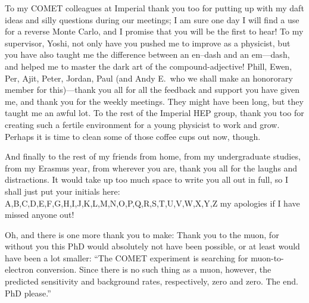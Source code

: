 \begin{acknowledgements}
To my COMET colleagues at Imperial thank you too for putting up with my daft ideas and silly questions during our meetings; I am sure one day I will find a use for a reverse Monte Carlo, and I promise that you will be the first to hear!
To my supervisor, Yoshi, not only have you pushed me to improve as a physicist, but you have also taught me the difference between an en--dash and an em---dash, and helped me to master the dark art of the compound-adjective!
	Phill, Ewen, Per, Ajit, Peter, Jordan, Paul (and Andy E.\ who we shall make an honororary member for this)---thank you all for all the feedback and support you have given me, and thank you for the weekly meetings.
They might have been long, but they taught me an awful lot.
To the rest of the Imperial HEP group, thank you too for creating such a fertile environment for a young physicist to work and grow.
Perhaps it is time to clean some of those coffee cups out now, though.

And finally to the rest of my friends from home, from my undergraduate studies, from my Erasmus year, from wherever you are, thank you all for the laughs and distractions.
It would take up too much space to write you all out in full, so I shall just put your initials here:
A,B,C,D,E,F,G,H,I,J,K,L,M,N,O,P,Q,R,S,T,U,V,W,X,Y,Z
my apologies if I have missed anyone out!

Oh, and there is one more thank you to make: 
Thank you to the muon, for without you this PhD would absolutely not have been possible, or at least would have been a lot smaller:
``The COMET experiment is searching for muon-to-electron conversion. Since there is no such thing as a muon, however, the predicted sensitivity and background rates, respectively, zero and zero.  The end. PhD please.''

%
%


\end{acknowledgements}


